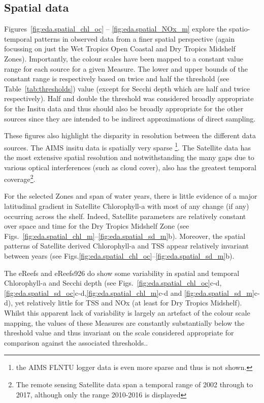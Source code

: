 \clearpage

\subsection{Spatial data}

Figures~\ref{fig:eda.spatial_chl_oc} -- \ref{fig:eda.spatial_NOx_m} explore the spatio-temporal
patterns in observed data from a finer spatial perspective (again focussing on just the Wet Tropics
Open Coastal and Dry Tropics Midshelf Zones).  Importantly, the colour scales have been mapped to
a constant value range for each source for a given Measure.  The lower and upper bounds of the
constant range is 
respectively based on twice and half the threshold (see Table~\ref{tab:thresholds}) value
(except for Secchi depth which are half and twice respectively).  Half and double the threshold was
considered broadly appropriate for the Insitu data and thus should also be broadly appropriate for the
other sources since they are intended to be indirect approximations of direct sampling.


These figures also highlight the disparity in resolution
between the different data sources. The AIMS insitu data is spatially very sparse \footnote{the AIMS
FLNTU logger data is even more sparse and thus is not shown.}.  The Satellite data has the most
extensive spatial resolution and notwithstanding the many gaps due to various optical interferences
(such as cloud cover), also has the greatest temporal coverage\footnote{The remote sensing Satellite data
span a temporal range of 2002 through to 2017, although only the range 2010-2016 is displayed}.

For the selected Zones and span of water years, there is little evidence of a major latitudinal
gradient in Satellite Chlorophyll-a with most of any change (if any) occurring across the shelf.
Indeed, Satellite parameters are relatively constant over space and time for the Dry Tropics
Midshelf Zone (see Figs.~\ref{fig:eda.spatial_chl_m}--\ref{fig:eda.spatial_sd_m}b).  Moreover, the
spatial patterns of Satellite derived Chlorophyll-a and TSS appear relatively invariant between
years (see Figs.\ref{fig:eda.spatial_chl_oc}--\ref{fig:eda.spatial_sd_m}b).

The eReefs and eReefs926 do show some variability in spatial and temporal Chlorophyll-a and Secchi
depth (see
Figs.~\ref{fig:eda.spatial_chl_oc}c-d,\ref{fig:eda.spatial_sd_oc}c-d,\ref{fig:eda.spatial_chl_m}c-d
and \ref{fig:eda.spatial_sd_m}c-d), yet relatively little for TSS and NOx (at least for Dry Tropics
Midshelf).  Whilst this apparent lack of variability is largely an artefact of the colour scale mapping,
the values of these Measures are constantly
substantially below the threshold value and thus invariant on the scale considered
appropriate for comparison against the associated thresholds..


